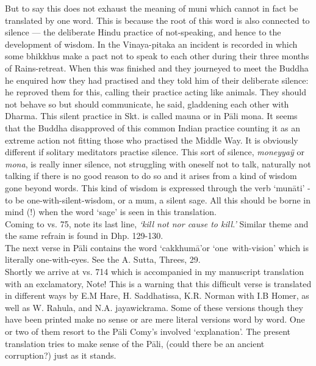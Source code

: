 But to say this does not exhaust the meaning of muni which cannot in fact be translated by one word. This is because the root of this word is also connected to silence — the deliberate Hindu practice of not-speaking, and hence to the development of wisdom. In the Vinaya-pitaka an incident is recorded in which some bhikkhus make a pact not to speak to each other during their three months of Rains-retreat. When this was finished and they journeyed to meet the Buddha he enquired how they had practised and they told him of their deliberate silence: he reproved them for this, calling their practice acting like animals. They should not behave so but should communicate, he said, gladdening each other with Dharma. This silent practice in Skt. is called mauna or in P\=ali mona. It seems that the Buddha disapproved of this common Indian practice counting it as an extreme action not fitting those who practised the Middle Way. It is obviously different if solitary meditators practise silence. This sort of silence, \textit{moneyya\"y} or \textit{mona}, is really inner silence, not struggling with oneself not to talk, naturally not talking if there is no good reason to do so and it arises from a kind of wisdom gone beyond words. This kind of wisdom is expressed through the verb `mun\=ati' - to be one-with-silent-wisdom, or a mum, a silent sage. All this should be borne in mind (!) when the word `sage' is seen in this translation.\\

Coming to vs. 75, note its last line, \textit{`kill not nor cause to kill.'} Similar theme and the same refrain is found in Dhp. 129-130.\\

The next verse in P\=ali contains the word `cakkhum\=a'or `one~with-vision' which is literally one-with-eyes. See the A. Sutta, Threes, 29.\\

Shortly we arrive at vs. 714 which is accompanied in my manuscript translation with an exclamatory, Note! This is a warning that this difﬁcult verse is translated in different ways by E.M Hare, H. Saddhatissa, K.R. Norman with I.B Homer, as well as W. Rahula, and N.A. jayawickrama. Some of these versions though they have been printed make no sense or are mere literal versions word by word. One or two of them resort to the P\=ali Comy's involved `explanation'. The present translation tries to make sense of the P\=ali, (could there be an ancient corruption?) just as it stands.\\

